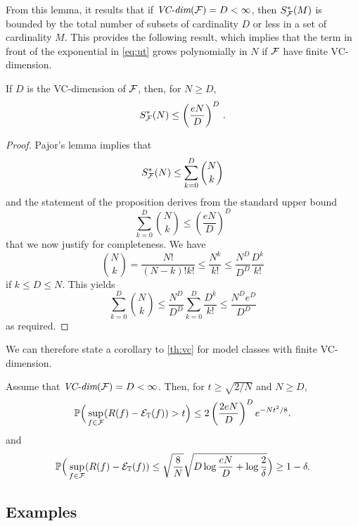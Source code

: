 From this lemma, it results that if $\textit{VC-dim}({\mathcal F}) = D<\infty$, then $S^*_{\mathcal F}(M)$ is bounded by the total number of subsets of cardinality $D$ or less in a set of cardinality $M$. This provides the following result, which implies that the term in front of the exponential in \cref{eq:ut} grows polynomially in $N$ if ${\mathcal F}$ have finite VC-dimension.
\begin{proposition}
\label{prop:sauer}
If $D$ is the VC-dimension of ${\mathcal F}$, then, for $N\geq D$,
\[
S^*_{\mathcal F}(N) \leq \left(\frac{eN}{D}\right)^D\,.
\]
\end{proposition}
\begin{proof}
Pajor's lemma implies that 
\[
S^*_{\mathcal F}(N) \leq \sum_{k=0}^D \binom{N}{k}
\]
and the statement of the proposition derives from the standard upper bound
\[
\sum_{k=0}^D \binom{N}{k} \leq \left(\frac{eN}{D}\right)^D
\]
that we now justify for completeness. We have
\[
\binom{N}{k} = \frac{N!}{(N-k)!k!} \leq \frac{N^k}{k!} \leq \frac{N^D}{D^D}  \frac{D^k}{k!}
\]
if $k\leq D \leq N$. This yields
\[
\sum_{k=0}^D \binom{N}{k} \leq \frac{N^D}{D^D}  \sum_{k=0}^D \frac{D^k}{k!} \leq \frac{N^De^D}{D^D} 
\]
as required.
\end{proof}


We can therefore state a corollary to  \cref{th:vc} for model classes with finite VC-dimension.
\begin{corollary}
\label{corr:vc}
Assume that $\textit{VC-dim}({\mathcal F}) = D < \infty$. Then, for $t\geq \sqrt{2/N}$ and $N\geq D$, 
\begin{equation}
\label{eq:vc.corr}
\bm{\mathbb P}\Big(\sup_{f\in{\mathcal F}} (R(f) - {\mathcal E}_{\mathbb T}(f)) > t\Big) \leq 2 \left(\frac{2eN}D\right)^D e^{-Nt^2/8}.
\end{equation}
and
\begin{equation}
\label{eq:vc.corr.2}
\bm{\mathbb P}\Big(\sup_{f\in{\mathcal F}} (R(f) - {\mathcal E}_{\mathbb T}(f)) \leq \sqrt{\frac{8}N}\sqrt{D\log\frac{eN}D + \log\frac2\delta } \Big) \geq 1 - \delta.
\end{equation}
\end{corollary}

\subsection{Examples}

